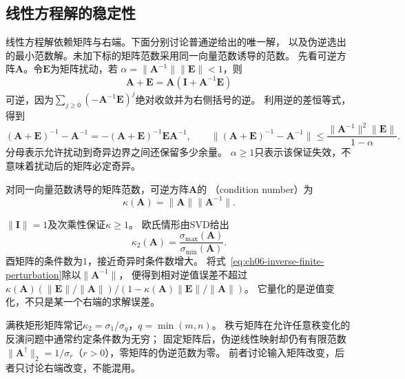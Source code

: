 \subsection{线性方程解的稳定性}
\label{sec:ch06-inverse-stability}
\label{sec:matrix-analysis-error-verification}

线性方程解依赖矩阵与右端。下面分别讨论普通逆给出的唯一解，
以及伪逆选出的最小范数解。未加下标的矩阵范数采用同一向量范数诱导的范数。
先看可逆方阵$\bm A$。令$\bm E$为矩阵扰动，若
$\alpha=\lVert\bm A^{-1}\rVert\lVert\bm E\rVert<1$，则
\[
 \bm A+\bm E=\bm A(\bm I+\bm A^{-1}\bm E)
\]
可逆，因为$\sum_{j\geq0}(-\bm A^{-1}\bm E)^j$绝对收敛并为右侧括号的逆。
利用逆的差恒等式，得到
\begin{equation}
 (\bm A+\bm E)^{-1}-\bm A^{-1}
 =-(\bm A+\bm E)^{-1}\bm E\bm A^{-1},\qquad
 \lVert(\bm A+\bm E)^{-1}-\bm A^{-1}\rVert
 \leq\frac{\lVert\bm A^{-1}\rVert^2\lVert\bm E\rVert}{1-\alpha}.
 \label{eq:ch06-inverse-finite-perturbation}
\end{equation}
分母表示允许扰动到奇异边界之间还保留多少余量。
$\alpha\geq1$只表示该保证失效，不意味着扰动后的矩阵必定奇异。

\begin{definition}[可逆矩阵的条件数]
\label{def:matrix-analysis-condition-number}
对同一向量范数诱导的矩阵范数，可逆方阵$\bm A$的
（condition number）为
\begin{equation}
 \kappa(\bm A)=\lVert\bm A\rVert\lVert\bm A^{-1}\rVert.
 \label{eq:matrix-analysis-condition-number}
\end{equation}
\end{definition}
$\lVert\bm I\rVert=1$及次乘性保证$\kappa\geq1$。
欧氏情形由SVD给出
\begin{equation}
 \kappa_2(\bm A)=\frac{\sigma_{\max}(\bm A)}{\sigma_{\min}(\bm A)}.
 \label{eq:matrix-analysis-spectral-condition-number}
\end{equation}
酉矩阵的条件数为$1$，接近奇异时条件数增大。
将式~\eqref{eq:ch06-inverse-finite-perturbation}除以$\lVert\bm A^{-1}\rVert$，
便得到相对逆值误差不超过
$\kappa(\bm A)(\lVert\bm E\rVert/\lVert\bm A\rVert)/
(1-\kappa(\bm A)\lVert\bm E\rVert/\lVert\bm A\rVert)$。
它量化的是逆值变化，不只是某一个右端的求解误差。

满秩矩形矩阵常记$\kappa_2=\sigma_1/\sigma_q$，$q=\min(m,n)$。
秩亏矩阵在允许任意秩变化的反演问题中通常约定条件数为无穷；
固定矩阵后，伪逆线性映射却仍有有限范数
$\lVert\bm A^\dagger\rVert_2=1/\sigma_r$（$r>0$），零矩阵的伪逆范数为零。
前者讨论输入矩阵改变，后者只讨论右端改变，不能混用。

